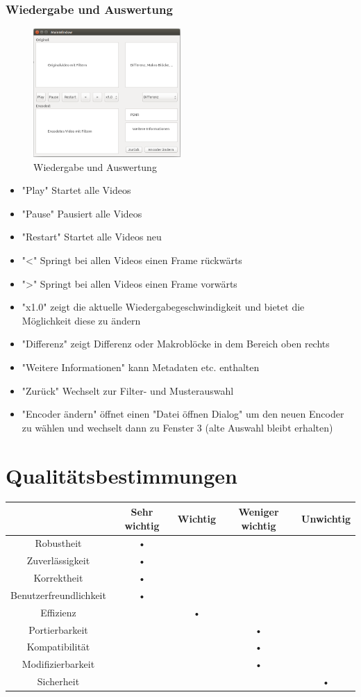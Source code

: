 \documentclass[parskip=full]{scrartcl}
\begin{document}
\subsubsection{Wiedergabe und Auswertung}
\begin{figure}[htbp]
\centering
\includegraphics[width=0.5\textwidth]{GUI_Entwurf_1/GUI_4.png}
\caption{Wiedergabe und Auswertung}
\end{figure}
\begin{itemize}
\item "Play" Startet alle Videos
\item "Pause" Pausiert alle Videos
\item "Restart" Startet alle Videos neu
\item "<" Springt bei allen Videos einen Frame rückwärts
\item ">" Springt bei allen Videos einen Frame vorwärts
\item "x1.0" zeigt die aktuelle Wiedergabegeschwindigkeit und bietet die Möglichkeit diese zu ändern
\item "Differenz" zeigt Differenz oder Makroblöcke in dem Bereich oben rechts
\item "Weitere Informationen" kann Metadaten etc. enthalten
\item "Zurück" Wechselt zur Filter- und Musterauswahl
\item "Encoder ändern" öffnet einen "Datei öffnen Dialog" um den neuen Encoder zu wählen und wechselt dann zu Fenster 3 (alte Auswahl bleibt erhalten)
\end{itemize}
\newpage
\section{Qualitätsbestimmungen}
\begin{tabular}{|c|c|c|c|c|}
\hline & Sehr wichtig & Wichtig & Weniger wichtig & Unwichtig \\
\hline Robustheit & • &  &  & \\ 
\hline Zuverlässigkeit & • &  &  & \\ 
\hline Korrektheit & • &  &  & \\ 
\hline Benutzerfreundlichkeit & • &  &  & \\ 
\hline Effizienz &  & • &  & \\ 
\hline Portierbarkeit &  &  & • & \\ 
\hline Kompatibilität &  &  & • & \\ 
\hline Modifizierbarkeit &  &  & • & \\ 
\hline Sicherheit &  &  &  & • \\ 
\hline 
\end{tabular} 
\newpage
\end{document}
